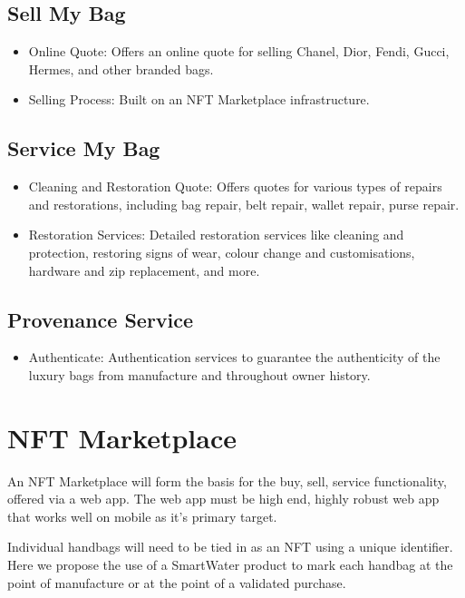 \documentclass{tufte-handout}
\begin{document}
\subsection{Sell My Bag}\label{sec:page-layout}
\begin{itemize}
    \item Online Quote: Offers an online quote for selling Chanel, Dior, Fendi, Gucci, Hermes, and other branded bags.
    \item Selling Process: Built on an NFT Marketplace infrastructure.
\end{itemize}

\subsection{Service My Bag}\label{sec:page-layout}
\begin{itemize}
    \item Cleaning and Restoration Quote: Offers quotes for various types of repairs and restorations, including bag repair, belt repair,
    wallet repair, purse repair.
    \item Restoration Services: Detailed restoration services like cleaning and protection, restoring signs of wear, colour change and
    customisations, hardware and zip replacement, and more.
\end{itemize}

\subsection{Provenance Service}\label{sec:page-layout}
\begin{itemize}
    \item Authenticate: Authentication services to guarantee the authenticity of the luxury bags from manufacture and throughout owner history.
\end{itemize}

\section{NFT Marketplace}\label{sec:page-layout}
An NFT Marketplace will form the basis for the buy, sell, service functionality, offered via a web app. The web app must be high end, highly robust
web app that works well on mobile as it's primary target.

Individual handbags will need to be tied in as an NFT using a unique identifier. Here we propose the use of a SmartWater product to mark each handbag
at the point of manufacture or at the point of a validated purchase.
\end{document}

